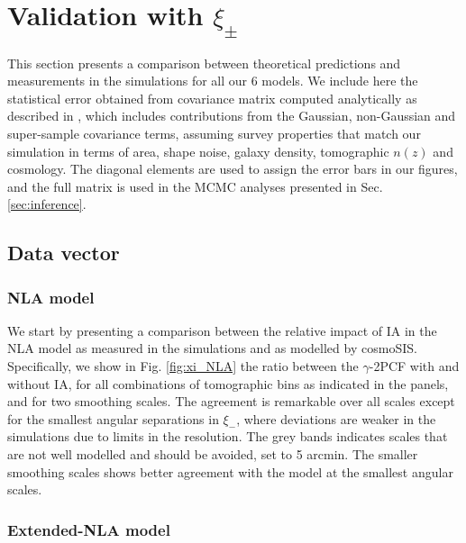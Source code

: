\section{Validation with $\xi_{\pm}$}
\label{sec:validation}



This section presents a comparison between theoretical predictions and measurements in the simulations for all our 6 models. We include here the statistical error obtained from covariance matrix computed analytically as described in \citet{KiDS1000_Joachimi}, which includes contributions from the Gaussian, non-Gaussian and super-sample covariance terms, assuming survey properties that match our simulation in terms of area, shape noise, galaxy density, tomographic $n(z)$ and cosmology.   The diagonal elements are used to assign the error bars in our figures, and the full matrix is used in the MCMC analyses presented in Sec. \ref{sec:inference}.




\subsection{Data vector}
\subsubsection*{NLA model}

We start by presenting a comparison between the relative impact of IA in the NLA model as measured in the simulations and as modelled by {\sc cosmoSIS}. Specifically, we show in Fig. \ref{fig:xi_NLA} the ratio between the $\gamma$-2PCF with and without IA, for all combinations of tomographic bins as indicated in the panels, and for two smoothing scales. The agreement is remarkable over all scales except for the smallest angular separations in $\xi_-$, where deviations are weaker in the simulations due to limits in the resolution.  The grey bands  indicates scales that are not well modelled and should be avoided, set to 5 arcmin. The smaller smoothing scales shows better agreement with the model at the smallest angular scales. 


\subsubsection*{Extended-NLA model}


